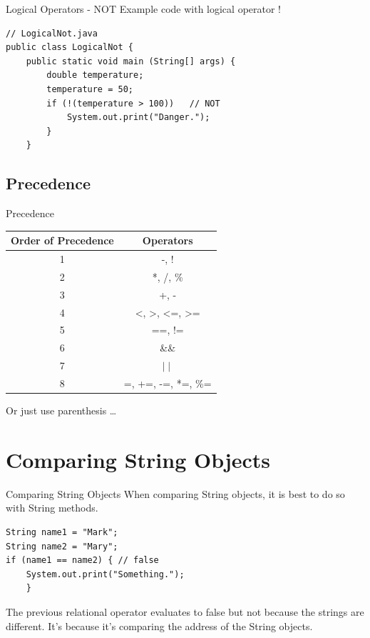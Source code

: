\documentclass[11pt]{beamer}
\begin{document}
\begin{frame}[fragile]{Logical Operators - NOT}
    Example code with logical operator !
    \begin{lstlisting}
// LogicalNot.java
public class LogicalNot {
    public static void main (String[] args) {
        double temperature;
        temperature = 50;
        if (!(temperature > 100))	// NOT
            System.out.print("Danger.");
        }
    }
    \end{lstlisting}
\end{frame}

\subsection{Precedence}
\begin{frame}{Precedence}
    \begin{table}[]
    \begin{tabular}{|c|c|}
    \hline
    Order of Precedence & Operators                                                  \\ \hline
    1                   & -, !                                                       \\ \hline
    2                   & *, /, \%                                                   \\ \hline
    3                   & +, -                                                       \\ \hline
    4                   & \textless{}, \textgreater{}, \textless{}=, \textgreater{}= \\ \hline
    5                   & ==, !=                                                     \\ \hline
    6                   & \&\&                                                       \\ \hline
    7                   & $\mid \mid$                                                \\ \hline
    8                   & =, +=, -=, *=, \%=                                         \\ \hline
    \end{tabular}
    \end{table}
    Or just use parenthesis \ldots
\end{frame}

\section{Comparing String Objects}
\begin{frame}[fragile]{Comparing String Objects}
    When comparing {String} objects, it is best to do so with String methods.
        \begin{lstlisting}
String name1 = "Mark";
String name2 = "Mary";
if (name1 == name2) { // false
    System.out.print("Something.");
    }
    \end{lstlisting}
    The previous relational operator evaluates to false but not because the strings are different. It's because it's comparing the address of the String objects.
\end{frame}
\end{document}
